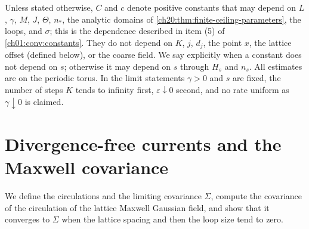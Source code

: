 Unless stated otherwise, $C$ and $c$ denote positive constants that may depend on $L$, $\gamma$, $M$, $J$, $\Theta$, $n_*$, the analytic domains of \cref{ch20:thm:finite-ceiling-parameters}, the loops, and $\sigma$; this is the dependence described in item (5) of \cref{ch01:conv:constants}. They do not depend on $K$, $j$, $d_j$, the point $x$, the lattice offset (defined below), or the coarse field. We say explicitly when a constant does not depend on $s$; otherwise it may depend on $s$ through $H_s$ and $n_s$. All estimates are on the periodic torus. In the limit statements $\gamma>0$ and $s$ are fixed, the number of steps $K$ tends to infinity first, $\varepsilon\downarrow0$ second, and no rate uniform as $\gamma\downarrow0$ is claimed.

\section{Divergence-free currents and the Maxwell covariance}\label{ch28:sec:free}

We define the circulations and the limiting covariance $\Sigma$, compute the covariance of the circulation of the lattice Maxwell Gaussian field, and show that it converges to $\Sigma$ when the lattice spacing and then the loop size tend to zero.

